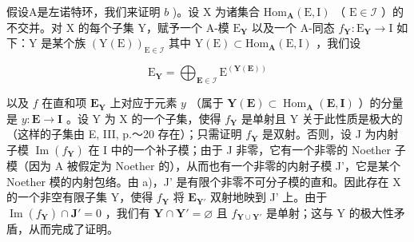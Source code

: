 假设A是左诺特环，我们来证明 \(b\) )。设 X 为诸集合 \(\mathrm{Hom}_{\mathbf{A}}(\mathrm{E},\mathrm{I})\) （ \(\mathrm{E}\in\mathcal{I}\) ）的不交并。对 X 的每个子集 Y，赋予一个 A-模 \(\mathrm{E}_{\mathbf{Y}}\) 以及一个 A-同态 \(f_{\mathbf{Y}}:\mathrm{E}_{\mathbf{Y}}\to\mathrm{I}\) 如下：Y 是某个族 \((\mathrm{Y}(\mathrm{E}))_{\mathrm{E}\in\mathcal{I}}\) 其中 \(\mathrm{Y}(\mathrm{E})\subset\mathrm{Hom}_{\mathbf{A}}(\mathrm{E},\mathrm{I})\) ，我们设

\[
\mathrm{E} _ {\mathbf {Y}} = \bigoplus_ {\mathbf {E} \in \mathcal {I}} \mathrm{E} ^ {(\mathbf {Y} (\mathbf {E}))}
\]

以及 \(f\) 在直和项 \(\mathbf{E}_{\mathbf{Y}}\) 上对应于元素 \(y\) （属于 \(\mathbf{Y}(\mathbf{E}) \subset \operatorname{Hom}_{\mathbf{A}}(\mathbf{E}, \mathbf{I})\) ）的分量是 \(y: \mathbf{E} \to \mathbf{I}\) 。设 Y 为 X 的一个子集，使得 \(f_{\mathbf{Y}}\) 是单射且 Y 关于此性质是极大的（这样的子集由 E, III, p.～20 存在）；只需证明 \(f_{\mathbf{Y}}\) 是双射。否则，设 J 为内射子模 \(\operatorname{Im}(f_{\mathbf{Y}})\) 在 I 中的一个补子模；由于 J 非零，它有一个非零的 Noether 子模（因为 A 被假定为 Noether 的），从而也有一个非零的内射子模 J'，它是某个 Noether 模的内射包络。由 a)，J' 是有限个非零不可分子模的直和。因此存在 X 的一个非空有限子集 Y，使得 \(f_{\mathbf{Y}}\) 将 \(\mathbf{E}_{\mathbf{Y}'}\) 双射地映到 J' 上。由于 \(\operatorname{Im}(f_{\mathbf{Y}}) \cap \mathbf{J}' = 0\) ，我们有 \(\mathbf{Y} \cap \mathbf{Y}' = \varnothing\) 且 \(f_{\mathbf{Y} \cup \mathbf{Y}'}\) 是单射；这与 Y 的极大性矛盾，从而完成了证明。

